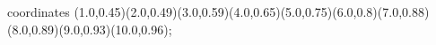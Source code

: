 					coordinates { (1.0,0.45)(2.0,0.49)(3.0,0.59)(4.0,0.65)(5.0,0.75)(6.0,0.8)(7.0,0.88)(8.0,0.89)(9.0,0.93)(10.0,0.96)};